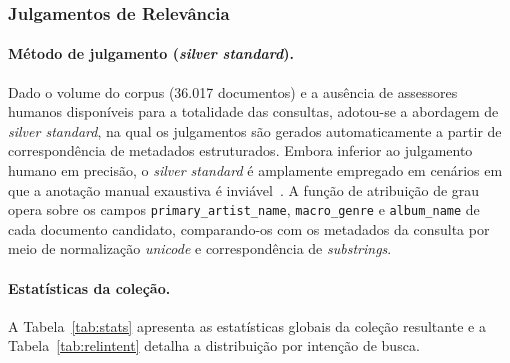 \documentclass[12pt]{article}
\begin{document}
\subsubsection{Julgamentos de Relevância}
\label{sec:qrels}

\paragraph{Método de julgamento (\textit{silver standard}).} Dado o volume do
corpus (36.017 documentos) e a ausência de assessores humanos disponíveis para a
totalidade das consultas, adotou-se a abordagem de \textit{silver
standard}, na qual os julgamentos são gerados
automaticamente a partir de correspondência de metadados estruturados. Embora
inferior ao julgamento humano em precisão, o \textit{silver standard} é
amplamente empregado em cenários em que a anotação manual exaustiva é
inviável~\cite{buckley2004retrieval}. A função de atribuição de grau opera sobre
os campos \texttt{primary\_artist\_name}, \texttt{macro\_genre} e
\texttt{album\_name} de cada documento candidato, comparando-os com os metadados
da consulta por meio de normalização \textit{unicode} e correspondência de
\textit{substrings}.

\paragraph{Estatísticas da coleção.} A Tabela~\ref{tab:stats} apresenta as
estatísticas globais da coleção resultante e a Tabela~\ref{tab:relintent}
detalha a distribuição por intenção de busca.
\end{document}
